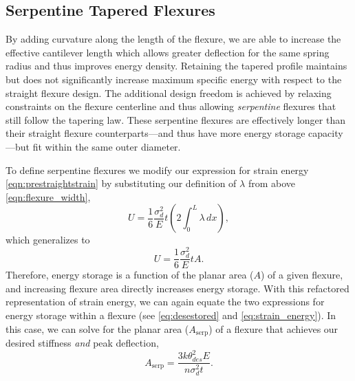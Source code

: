 \documentclass[letterpaper, 10 pt, conference]{ieeeconf} %
\begin{document}
\subsection{Serpentine Tapered Flexures}
By adding curvature along the length of the flexure, we are able to increase the effective cantilever length which allows greater deflection for the same spring radius and thus improves energy density. Retaining the tapered profile maintains but does not significantly increase maximum specific energy with respect to the straight flexure design. The additional design freedom is achieved by relaxing constraints on the flexure centerline and thus allowing \textit{serpentine} flexures that still follow the tapering law. These serpentine flexures are effectively longer than their straight flexure counterparts---and thus have more energy storage capacity---but fit within the same outer diameter. 

To define serpentine flexures we modify our expression for strain energy \eqref{eqn:prestraightstrain} by substituting our definition of $\lambda$ from above \eqref{eqn:flexure_width},
\begin{equation}
    U = \frac{1}{6}\frac{\sigma_d^2}{E}t(2\int_{0}^{L} \lambda\,dx),
\end{equation}
which generalizes to
\begin{equation}
    U = \frac{1}{6}\frac{\sigma_d^2}{E}tA. \label{eq:strain_energy}
\end{equation}
Therefore, energy storage is a function of the planar area ($A$) of a given flexure, and increasing flexure area directly increases energy storage. With this refactored representation of strain energy, we can again equate the two expressions for energy storage within a flexure (see \eqref{eq:desestored} and \eqref{eq:strain_energy}). In this case, we can solve for the planar area ($A_{\mathrm{serp}}$) of a flexure that achieves our desired stiffness \textit{and} peak deflection,
\begin{equation}
    A_{\mathrm{serp}} = \frac{3k\theta_{des}^2E}{n\sigma_d^2t}.
\end{equation}
\end{document}

